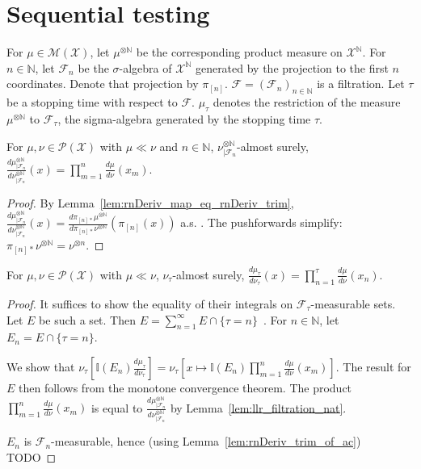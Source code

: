 \section{Sequential testing}

For $\mu \in \mathcal M(\mathcal X)$, let $\mu^{\otimes \mathbb{N}}$ be the corresponding product measure on $\mathcal X^{\mathbb{N}}$.
For $n \in \mathbb{N}$, let $\mathcal F_n$ be the $\sigma$-algebra of $\mathcal X^{\mathbb{N}}$ generated by the projection to the first $n$ coordinates. Denote that projection by $\pi_{[n]}$.
$\mathcal F = (\mathcal F_n)_{n \in \mathbb{N}}$ is a filtration.
Let $\tau$ be a stopping time with respect to $\mathcal F$. $\mu_\tau$ denotes the restriction of the measure $\mu^{\otimes \mathbb{N}}$ to $\mathcal F_\tau$, the sigma-algebra generated by the stopping time $\tau$.

\begin{lemma}
  \label{lem:llr_filtration_nat}
  For $\mu, \nu \in \mathcal P(\mathcal X)$ with $\mu \ll \nu$ and $n \in \mathbb{N}$, $\nu^{\otimes \mathbb{N}}_{| \mathcal F_n}$-almost surely,
  $\frac{d \mu^{\otimes \mathbb{N}}_{| \mathcal F_n}}{d \nu^{\otimes \mathbb{N}}_{| \mathcal F_n}}(x) = \prod_{m=1}^n \frac{d \mu}{d \nu}(x_m)$.
\end{lemma}

\begin{proof}%
{}
By Lemma~\ref{lem:rnDeriv_map_eq_rnDeriv_trim}, $\frac{d \mu^{\otimes \mathbb{N}}_{| \mathcal F_n}}{d \nu^{\otimes \mathbb{N}}_{| \mathcal F_n}}(x) = \frac{d \pi_{[n]*}\mu^{\otimes \mathbb{N}}}{d \pi_{[n]*}\nu^{\otimes \mathbb{N}}}(\pi_{[n]}(x))$ a.s. . The pushforwards simplify: $\pi_{[n]*}\nu^{\otimes \mathbb{N}} = \nu^{\otimes n}$.
\end{proof}

\begin{lemma}
  \label{lem:llr_stopping_time}
  For $\mu, \nu \in \mathcal P(\mathcal X)$ with $\mu \ll \nu$, $\nu_\tau$-almost surely,
  $\frac{d \mu_\tau}{d \nu_\tau}(x) = \prod_{n=1}^\tau \frac{d \mu}{d \nu}(x_n)$.
\end{lemma}

\begin{proof}
It suffices to show the equality of their integrals on $\mathcal F_\tau$-measurable sets. Let $E$ be such a set.
Then $E = \sum_{n=1}^\infty E \cap \{\tau = n\}$~. For $n \in \mathbb{N}$, let $E_n = E \cap \{\tau = n\}$.

We show that $\nu_\tau \left[\mathbb{I}(E_n) \frac{d \mu_\tau}{d \nu_\tau}\right] = \nu_\tau\left[x \mapsto \mathbb{I}(E_n)\prod_{m=1}^n \frac{d \mu}{d \nu}(x_m)\right]$.
The result for $E$ then follows from the monotone convergence theorem.
The product $\prod_{m=1}^n \frac{d \mu}{d \nu}(x_m)$ is equal to $\frac{d \mu^{\otimes \mathbb{N}}_{| \mathcal F_n}}{d \nu^{\otimes \mathbb{N}}_{| \mathcal F_n}}$ by Lemma~\ref{lem:llr_filtration_nat}.

$E_n$ is $\mathcal F_n$-measurable, hence (using Lemma~\ref{lem:rnDeriv_trim_of_ac})
TODO

\end{proof}

